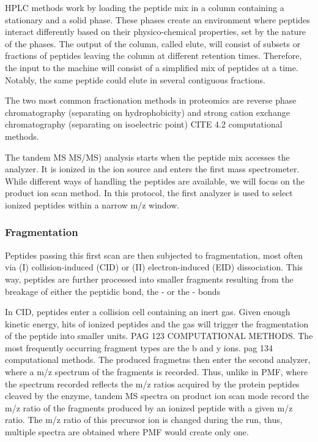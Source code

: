 \documentclass[11pt, a4paper]{report}
\begin{document}
\ac{HPLC} methods work by loading the peptide mix in a column containing a stationary and a solid phase. These phases create an environment where peptides interact differently based on their physico-chemical properties, set by the nature of the phases. The output of the column, called elute, will consist of subsets or fractions of peptides leaving the column at different retention times. Therefore, the input to the machine will consist of a simplified mix of peptides at a time. Notably, the same peptide could elute in several contiguous fractions.

The two most common fractionation methods in proteomics are reverse phase chromatography (separating on hydrophobicity) and strong cation exchange chromatography (separating on isoelectric point)  CITE 4.2 computational methods.

The tandem MS \ac{MS/MS}) analysis starts when the peptide mix accesses the analyzer. It is ionized in the ion source and enters the first mass spectrometer. While different ways of handling the peptides are available, we will focus on the product ion scan method. In this protocol, the first analyzer is used to select ionized peptides within a narrow m/z window.


\subsubsection{Fragmentation}

Peptides passing this first scan are then subjected to fragmentation, most often via (I) collision-induced (CID) or (II) electron-induced (EID) dissociation. This way, peptides are further processed into smaller fragments resulting from the breakage of either the peptidic bond, the - or the - bonds

In CID, peptides enter a collision cell containing an inert gas. Given enough kinetic energy, hits of ionized peptides and the gas will trigger the fragmentation of the peptide into smaller units. PAG 123 COMPUTATIONAL METHODS. The most frequently occurring fragment types are the b and y ions. pag 134 computational methods. The produced fragmetns then enter the second analyzer, where a m/z spectrum of the fragments is recorded. Thus, unlike in PMF, where the spectrum recorded reflects the m/z ratios acquired by the protein peptides cleaved by the enzyme, tandem MS spectra on product ion scan mode record the m/z ratio of the fragments produced by an ionized peptide with a given m/z ratio. The m/z ratio of this precursor ion is changed during the run, thus, multiple spectra are obtained where PMF would create only one.
\end{document}
